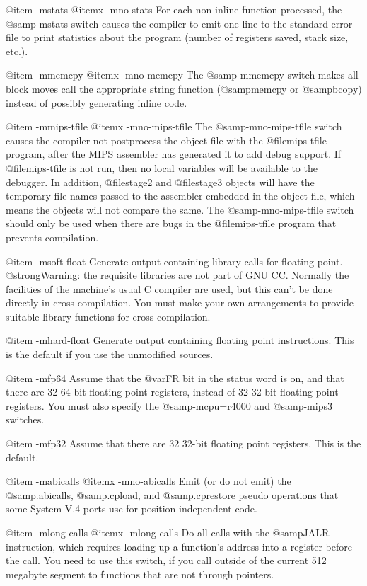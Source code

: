 {{@item -mstats
@itemx -mno-stats
For each non-inline function processed, the @samp{-mstats} switch
causes the compiler to emit one line to the standard error file to
print statistics about the program (number of registers saved, stack
size, etc.).

@item -mmemcpy
@itemx -mno-memcpy
The @samp{-mmemcpy} switch makes all block moves call the appropriate
string function (@samp{memcpy} or @samp{bcopy}) instead of possibly
generating inline code.

@item -mmips-tfile
@itemx -mno-mips-tfile
The @samp{-mno-mips-tfile} switch causes the compiler not
postprocess the object file with the @file{mips-tfile} program,
after the MIPS assembler has generated it to add debug support.  If
@file{mips-tfile} is not run, then no local variables will be
available to the debugger.  In addition, @file{stage2} and
@file{stage3} objects will have the temporary file names passed to the
assembler embedded in the object file, which means the objects will
not compare the same.  The @samp{-mno-mips-tfile} switch should only
be used when there are bugs in the @file{mips-tfile} program that
prevents compilation.

@item -msoft-float
Generate output containing library calls for floating point.
@strong{Warning:} the requisite libraries are not part of GNU CC.
Normally the facilities of the machine's usual C compiler are used, but
this can't be done directly in cross-compilation.  You must make your
own arrangements to provide suitable library functions for
cross-compilation.

@item -mhard-float
Generate output containing floating point instructions.  This is the
default if you use the unmodified sources.

@item -mfp64
Assume that the @var{FR} bit in the status word is on, and that there
are 32 64-bit floating point registers, instead of 32 32-bit floating
point registers.  You must also specify the @samp{-mcpu=r4000} and
@samp{-mips3} switches.

@item -mfp32
Assume that there are 32 32-bit floating point registers.  This is the
default.

@item -mabicalls
@itemx -mno-abicalls
Emit (or do not emit) the @samp{.abicalls}, @samp{.cpload}, and
@samp{.cprestore} pseudo operations that some System V.4 ports use for
position independent code.

@item -mlong-calls
@itemx -mlong-calls
Do all calls with the @samp{JALR} instruction, which requires
loading up a function's address into a register before the call.
You need to use this switch, if you call outside of the current
512 megabyte segment to functions that are not through pointers.

}}
